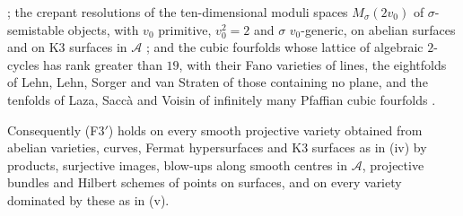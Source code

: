 \begin{proposition}
\begin{enumerate}[label=\textup{(\roman*)},leftmargin=2.6em,itemsep=2pt]
  \cite[Theorem~1.1]{Flo23}; the crepant resolutions of the ten-dimensional
  moduli spaces $M_{\sigma}(2v_{0})$ of $\sigma$-semistable objects, with
  $v_{0}$ primitive, $v_{0}^{2}=2$ and $\sigma$ $v_{0}$-generic, on abelian
  surfaces and on K3 surfaces in $\mathcal{A}$
  \cite[Theorem~1.3, Corollary~4.5]{FFZ21}; and the cubic fourfolds whose
  lattice of algebraic $2$-cycles has rank greater than $19$, with their Fano
  varieties of lines, the eightfolds of Lehn, Lehn, Sorger and van Straten of
  those containing no plane, and the tenfolds of Laza, Sacc\`a and Voisin of
  infinitely many Pfaffian cubic fourfolds \cite[Theorem~3.5 and its proof,
  Proposition~3.9, Theorem~4.2]{ABLP26}.
\end{enumerate}
Consequently \textup{(F3$'$)} holds on every smooth projective variety
obtained from abelian varieties, curves, Fermat hypersurfaces and K3 surfaces
as in \textup{(iv)} by products, surjective images, blow-ups along smooth
centres in $\mathcal{A}$, projective bundles and Hilbert schemes of points on
surfaces, and on every variety dominated by these as in \textup{(v)}.
\end{proposition}


